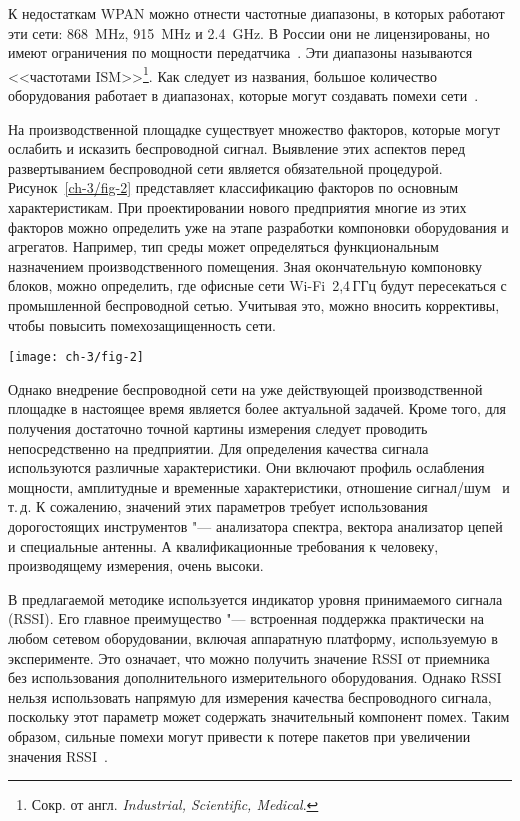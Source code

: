 К недостаткам WPAN можно отнести частотные диапазоны, в которых работают эти сети: \SI{868}{\mega\hertz}, \SI{915}{\mega\hertz} и \SI{2,4}{\giga\hertz}. В России они не лицензированы, но имеют ограничения по мощности передатчика~\cite{freq}. Эти диапазоны называются <<частотами ISM>>\footnote{Сокр. от англ. \textit{Industrial, Scientific, Medical}.}. Как следует из названия, большое количество оборудования работает в диапазонах, которые могут создавать помехи сети~\cite{750064, 6209430}.

На производственной площадке существует множество факторов, которые могут ослабить и исказить беспроводной сигнал. Выявление этих аспектов перед развертыванием беспроводной сети является обязательной процедурой. Рисунок~\cref{ch-3/fig-2} представляет классификацию факторов по основным характеристикам. При проектировании нового предприятия многие из этих факторов можно определить уже на этапе разработки компоновки оборудования и агрегатов. Например, тип среды может определяться функциональным назначением производственного помещения. Зная окончательную компоновку блоков, можно определить, где офисные сети Wi-Fi~2,4\,ГГц будут пересекаться с промышленной беспроводной сетью. Учитывая это, можно вносить коррективы, чтобы повысить помехозащищенность сети.

\begin{figure*}[ht]
	\centering
	\texttt{[image: ch-3/fig-2]}
	\caption{Классификация факторов ослабления беспроводного сигнала на производственной площадке}
	\label{ch-3/fig-2}
\end{figure*}

Однако внедрение беспроводной сети на уже действующей производственной площадке в настоящее время является более актуальной задачей. Кроме того, для получения достаточно точной картины измерения следует проводить непосредственно на предприятии. Для определения качества сигнала используются различные характеристики. Они включают профиль ослабления мощности, амплитудные и временные характеристики, отношение сигнал/шум~\cite{6133782} и т.\,д. К сожалению, значений этих параметров требует использования дорогостоящих инструментов "--- анализатора спектра, вектора анализатор цепей и специальные антенны. А квалификационные требования к человеку, производящему измерения, очень высоки.

В предлагаемой методике используется индикатор уровня принимаемого сигнала (RSSI). Его главное преимущество "--- встроенная поддержка практически на любом сетевом оборудовании, включая аппаратную платформу, используемую в эксперименте. Это означает, что можно получить значение RSSI от приемника без использования дополнительного измерительного оборудования. Однако RSSI нельзя использовать напрямую для измерения качества беспроводного сигнала, поскольку этот параметр может содержать значительный компонент помех. Таким образом, сильные помехи могут привести к потере пакетов при увеличении значения RSSI~\cite{8211460}.

